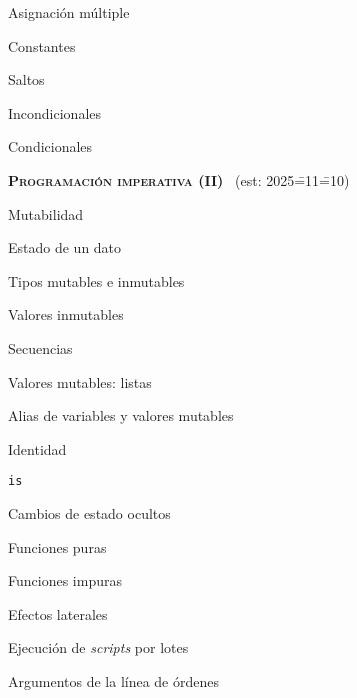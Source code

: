 \begin{longenum}
\begin{longenum}
\begin{longenum}
            \item Asignación múltiple
            \item Constantes
        \end{longenum}
        \item Saltos
        \begin{longenum}
            \item Incondicionales
            \item Condicionales
        \end{longenum}
    \end{longenum}
    \item \textbf{\textsc{Programación imperativa (II)}} \ (est: 2025\==11\==10)
    \begin{longenum}
        \item Mutabilidad
        \begin{longenum}
            \item Estado de un dato
            \item Tipos mutables e inmutables
            \begin{longenum}
                \item Valores inmutables
                \begin{longenum}
                    \item Secuencias
                \end{longenum}
                \item Valores mutables: listas
            \end{longenum}
            \item Alias de variables y valores mutables
            \item Identidad
            \begin{longenum}
                \item \texttt{is}
            \end{longenum}
        \end{longenum}
        \item Cambios de estado ocultos
        \begin{longenum}
            \item Funciones puras
            \item Funciones impuras
            \item Efectos laterales
            \item Ejecución de \textit{scripts} por lotes
            \begin{longenum}
                \item Argumentos de la línea de órdenes

\end{longenum}
\end{longenum}
\end{longenum}
\end{longenum}
